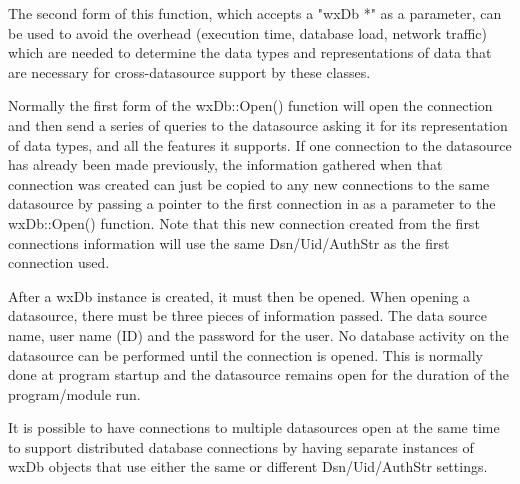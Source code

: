 The second form of this function, which accepts a "wxDb *" as a parameter, 
can be used to avoid the overhead (execution time, database load, network 
traffic) which are needed to determine the data types and representations 
of data that are necessary for cross-datasource support by these classes.  

Normally the first form of the wxDb::Open() function will open the connection 
and then send a series of queries to the datasource asking it for its 
representation of data types, and all the features it supports.  If one 
connection to the datasource has already been made previously, the information 
gathered when that connection was created can just be copied to any new 
connections to the same datasource by passing a pointer to the first 
connection in as a parameter to the wxDb::Open() function.  Note that this 
new connection created from the first connections information will use the 
same Dsn/Uid/AuthStr as the first connection used.




After a wxDb instance is created, it must then be opened.  When opening a 
datasource, there must be three pieces of information passed.  The data 
source name, user name (ID) and the password for the user.  No database 
activity on the datasource can be performed until the connection is opened.  
This is normally done at program startup and the datasource remains 
open for the duration of the program/module run.  

It is possible to have connections to multiple datasources open at the same 
time to support distributed database connections by having separate instances 
of wxDb objects that use either the same or different Dsn/Uid/AuthStr settings.

